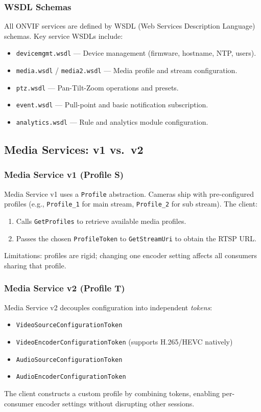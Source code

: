 \documentclass[12pt,a4paper]{article}
\begin{document}
\subsubsection{WSDL Schemas}
All ONVIF services are defined by WSDL (Web Services Description Language) schemas. Key service WSDLs include:
\begin{itemize}
    \item \texttt{devicemgmt.wsdl} --- Device management (firmware, hostname, NTP, users).
    \item \texttt{media.wsdl} / \texttt{media2.wsdl} --- Media profile and stream configuration.
    \item \texttt{ptz.wsdl} --- Pan-Tilt-Zoom operations and presets.
    \item \texttt{event.wsdl} --- Pull-point and basic notification subscription.
    \item \texttt{analytics.wsdl} --- Rule and analytics module configuration.
\end{itemize}

\subsection{Media Services: v1 vs.\ v2}

\subsubsection{Media Service v1 (Profile S)}
Media Service v1 uses a \texttt{Profile} abstraction. Cameras ship with pre-configured profiles (e.g., \texttt{Profile\_1} for main stream, \texttt{Profile\_2} for sub stream). The client:
\begin{enumerate}
    \item Calls \texttt{GetProfiles} to retrieve available media profiles.
    \item Passes the chosen \texttt{ProfileToken} to \texttt{GetStreamUri} to obtain the RTSP URL.
\end{enumerate}
Limitations: profiles are rigid; changing one encoder setting affects all consumers sharing that profile.

\subsubsection{Media Service v2 (Profile T)}
Media Service v2 decouples configuration into independent \emph{tokens}:
\begin{itemize}
    \item \texttt{VideoSourceConfigurationToken}
    \item \texttt{VideoEncoderConfigurationToken} (supports H.265/HEVC natively)
    \item \texttt{AudioSourceConfigurationToken}
    \item \texttt{AudioEncoderConfigurationToken}
\end{itemize}
The client constructs a custom profile by combining tokens, enabling per-consumer encoder settings without disrupting other sessions.
\end{document}
